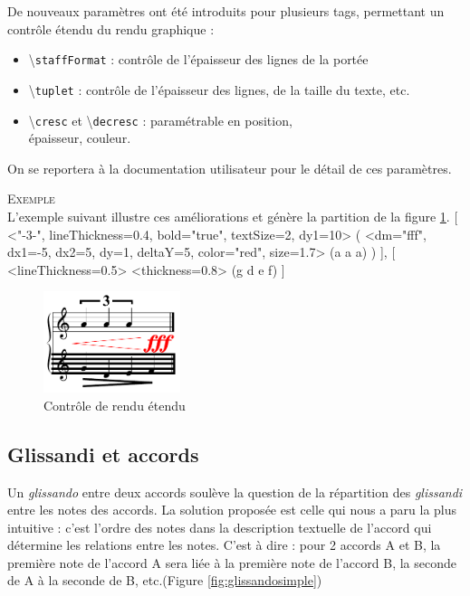 \documentclass{article}
\newenvironment{gmncode}	{\vspace{-2mm}\small\verbatim}{\endverbatim\vspace{-2mm}}
\newcommand{\code}[1]		{{\small \texttt{#1}}}
\newcommand{\guidotag}[1]	{\textbackslash\code{#1}}
\newcommand{\exemple}		{\vspace{2mm}\hspace*{-6mm}\textsc{Exemple}}
\begin{document}
De nouveaux paramètres ont été introduits pour plusieurs tags, permettant un contrôle étendu du rendu graphique :
\begin{itemize}
\item \guidotag{staffFormat} : contrôle de l'épaisseur des lignes de la portée
\item \guidotag{tuplet} : contrôle de l'épaisseur des lignes, de la taille du texte, etc.
\item \guidotag{cresc} et \guidotag{decresc} : paramétrable en position, \\épaisseur, couleur.
\end{itemize}
On se reportera à la documentation utilisateur pour le détail de ces paramètres.

\exemple\\
L'exemple suivant illustre ces améliorations et génère la partition de la figure \ref{fig:nouveauxParams}.
\begin{gmncode}
{
  [
    \tuplet<"-3-", lineThickness=0.4,
        bold="true", textSize=2, dy1=10> (
      \cresc<dm="fff", dx1=-5, dx2=5,
          dy=1, deltaY=5, color="red",
          size=1.7> (a a a)
    )
  ],
  [
    \staffFormat<lineThickness=0.5>
    \decresc<thickness=0.8> (g d e f)
  ]
}
\end{gmncode}
\begin{figure}[h]
\centering
\includegraphics[width=40mm]{img/partitions/nouveauxParams.pdf}
\caption{Contrôle de rendu étendu}
\label{fig:nouveauxParams}
\end{figure}

\subsection{Glissandi et accords}\label{subsec:glissandiAccords}

Un \emph{glissando} entre deux accords soulève la question de la répartition des \emph{glissandi} entre les notes des accords. La solution proposée est celle qui nous a paru la plus intuitive : c'est l'ordre des notes dans la description textuelle de l'accord qui détermine les relations entre les notes. C'est à dire : pour 2 accords A et B, la première note de l'accord A sera liée à la première note de l'accord B, la seconde de A à la seconde de B, etc.(Figure \ref{fig:glissandosimple})
\end{document}
